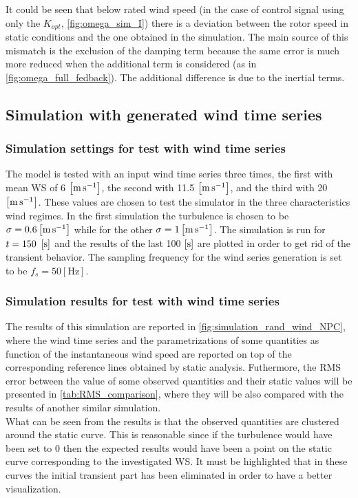 

It could be seen that below rated wind speed (in the case of control signal using only the $K_{opt}$, \autoref{fig:omega_sim_I}) there is a deviation between the rotor speed in static conditions and the one obtained in the simulation. The main source of this mismatch is the exclusion of the damping term because the same error is much more reduced when the additional term is considered (as in \autoref{fig:omega_full_fedback}). The additional difference is due to the inertial terms. 

\subsection{Simulation with generated wind time series}\label{sec:wind_series_sim}
\subsubsection[Simulation settings]{Simulation settings for test with wind time series}
The model is tested with an input wind time series three times, the first with mean \acrshort{WS} of 6 $\left[\si{\meter\per\second}\right]$, the second with 11.5 $\left[\si{\meter\per\second}\right]$, and the third with 20 $\left[\si{\meter\per\second}\right]$. These values are chosen to test the simulator in the three characteristics wind regimes. In the first simulation the turbulence is chosen to be $\sigma=0.6 \left[\si{\meter\per\second}\right]$ while for the other $\sigma=1 \left[\si{\meter\per\second}\right]$. The simulation is run for $t=150\ \left[\si{\second}\right]$ and the results of the last 100 $\left[\si{\second}\right]$ are plotted in order to get rid of the transient behavior. The sampling frequency for the wind series generation is set to be $f_s=50 \left[\si{\hertz}\right]$.

\subsubsection[Simulation results]{Simulation results for test with wind time series}
The results of this simulation are reported in \autoref{fig:simulation_rand_wind_NPC}, where the wind time series and the parametrizations of some quantities as function of the instantaneous wind speed are reported on top of the corresponding reference lines obtained by static analysis. Futhermore, the \acrfull{RMS} error between the value of some observed quantities and their static values will be presented in \autoref{tab:RMS_comparison}, where they will be also compared with the results of another similar simulation. \\
What can be seen from the results is that the observed quantities are clustered around the static curve. This is reasonable since if the turbulence would have been set to 0 then the expected results would have been a point on the static curve corresponding to the investigated WS. It must be highlighted that in these curves the initial transient part has been eliminated in order to have a better visualization. 

